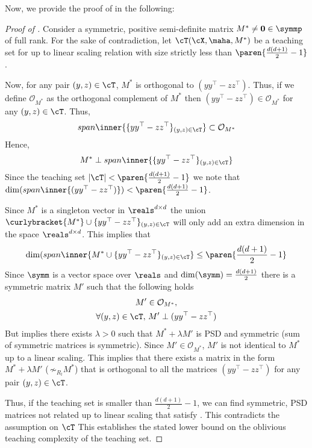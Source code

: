 Now, we provide the proof of  in the following:
\begin{proof}[Proof of ] 
    Consider a symmetric, positive semi-definite matrix $M^* \neq {\bf 0} \in \symmp$ of full rank. For the sake of contradiction, let $\cT(\cX, \maha, M^*)$ be a teaching set for  up to linear scaling relation with size strictly less than $\paren{\frac{d(d+1)}{2} - 1}$.
    
    Now, for any pair $(y,z) \in \cT$, $M^*$ is orthogonal to $(yy^{\top} - zz^{\top})$. Thus, if we define $\mathcal{O}_{M^*}$ as the orthogonal complement of $M^*$ then $(yy^{\top} - zz^{\top}) \in \mathcal{O}_{M^*}$ for any $(y,z) \in \cT$. Thus,
    \begin{align*}
        span\inner{\{yy^{\top} - zz^{\top}\}_{(y,z) \in \cT}} \subset \mathcal{O}_{M^*}
    \end{align*}
    Hence,
    \begin{align*}
        M^* \perp span\inner{\{yy^{\top} - zz^{\top}\}_{(y,z) \in \cT}}
    \end{align*}
    Since the teaching set $|\cT| < \paren{\frac{d(d+1)}{2} - 1}$ we note that $\dim (span\inner{(yy^{\top} - zz^{\top})}) < \paren{\frac{d(d+1)}{2} - 1}$. 
    
    Since $M^*$ is a singleton vector in $\reals^{d \times d}$ the union  $\curlybracket{M^*} \cup \{yy^{\top} - zz^{\top}\}_{(y,z) \in \cT}$ will only add an extra dimension in the space $\reals^{d \times d}$. This implies that
    \begin{align*}
        \dim(span\inner{M^*\cup \{yy^{\top} - zz^{\top}\}_{(y,z) \in \cT}} \le \paren{\frac{d(d+1)}{2} - 1}
    \end{align*}
    Since $\symm$ is a vector space over $\reals$ and $\dim(\symm) = \frac{d(d+1)}{2}$ there is a symmetric matrix $M'$ such that the following holds
    \begin{gather*}    
        M' \in \mathcal{O}_{M^*},\\
        \forall (y,z) \in \cT,\,  M' \perp (yy^{\top} - zz^{\top})
    \end{gather*}
    But  implies there exists $\lambda > 0$ such that $M^* + \lambda M'$ is PSD and symmetric (sum of symmetric matrices is symmetric). Since $M' \in \mathcal{O}_{M^*}$, $M'$ is not identical to $M^*$ up to a linear scaling. This implies that there exists a matrix in the form $M^* + \lambda M'$ ($\,\not \sim_{R_l} M^*$) that is orthogonal to all the matrices $(yy^{\top} - zz^{\top})$ for any pair $(y,z) \in \cT$.
    
    Thus, if the teaching set is smaller than $\frac{d(d+1)}{2} - 1$, we can find symmetric, PSD matrices not related up to linear scaling that satisfy . This contradicts the assumption on $\cT$ This establishes the stated lower bound on the oblivious teaching complexity of the teaching set.
\end{proof}


